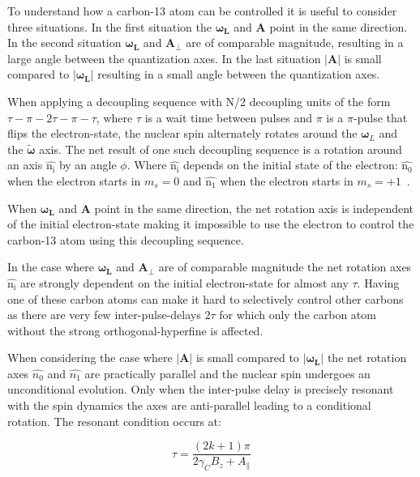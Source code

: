To understand how a carbon-13 atom can be controlled it is useful to consider three situations. In the first situation the $\bm{\omega_L}$ and $\bm{A}$ point in the same direction. In the second situation $\bm{\omega_L}$ and $\bm{A_\perp}$ are of comparable magnitude, resulting in a large angle between the quantization axes. In the last situation $|\bm{A}|$ is small compared to  $\bm{|\omega_L|}$ resulting in a small angle between the quantization axes.

When applying a decoupling sequence with N\slash 2 decoupling units of the form {$\tau - \pi -2\tau-\pi-\tau$}, where $\tau$ is a wait time between pulses and $\pi$ is a $\pi$-pulse that flips the electron-state, the nuclear spin alternately rotates around the  $\bm\omega_L$ and the $\bm{\tilde{\omega}}$ axis. The net result of one such decoupling sequence is a rotation around an axis $\bm{\hat{\mathrm{n_i}}}$ by an angle $\phi$. Where $\bm{\hat{\mathrm{n_i}}}$ depends on the initial state of the electron: $\bm{\hat{\mathrm{n_0}}}$ when the electron starts in $m_s = 0$ and $\bm{\hat{\mathrm{n_1}}}$ when the electron starts in $m_s = +1$~\citep{Taminiau2012Detection}.

When $\bm{\omega_L}$ and $\bm{A}$ point in the same direction, the net rotation axis is independent of the initial electron-state making it impossible to use the electron to control the carbon-13 atom using this decoupling sequence.

In the case where $\bm{\omega_L}$ and $\bm{A_\perp}$ are of comparable magnitude the net rotation axes $\bm{\hat{\mathrm{n_i}}}$ are strongly dependent on the initial electron-state for almost any $\tau$. Having one of these carbon atoms can make it hard to selectively control other carbons as there are very few inter-pulse-delays $2\tau$ for which only the carbon atom without the strong orthogonal-hyperfine is affected.

When considering the case where $\bm{|A|}$ is small compared to  $\bm{|\omega_L|}$ the net rotation axes  $\hat{n_0}$ and $\hat{n_1}$ are practically parallel and the nuclear spin undergoes an unconditional evolution. Only when the inter-pulse delay is precisely resonant with the spin dynamics the axes are anti-parallel leading to a conditional rotation\citep{Taminiau2012Detection}. The resonant condition occurs at:

 \begin{equation}
\tau = \frac{(2k+1)\pi}{2 \gamma_C B_z + A_\parallel}
\label{eq:res_dip_loc}
\end{equation}

